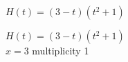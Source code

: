 {$H(t) = (3-t)(t^2+1)$
}
{$H(t) = (3-t)\left(t^2+1\right)$\\
$x =3$ multiplicity 1

\begin{center}
\end{center}}